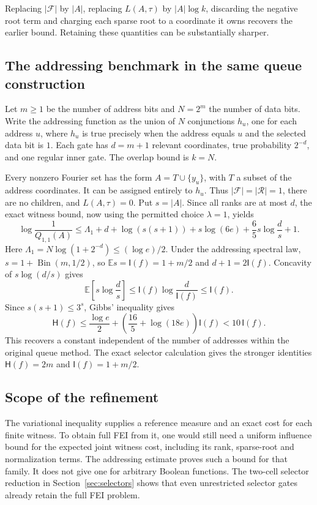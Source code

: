 \documentclass[11pt]{amsart}
\theoremstyle{definition}
\theoremstyle{remark}
\newcommand{\E}{\mathbb E}
\newcommand{\HH}{\mathsf H}
\newcommand{\I}{\mathsf I}
\begin{document}
Replacing $|\mathcal F|$ by $|A|$, replacing $L(A,\tau)$ by
$|A|\log k$, discarding the negative root term and charging each sparse
root to a coordinate it owns recovers the earlier bound. Retaining these
quantities can be substantially sharper.

\subsection{The addressing benchmark in the same queue construction}

Let $m\ge1$ be the number of address bits and $N=2^m$ the number of
data bits. Write the addressing function as the union of $N$ conjunctions
$h_u$, one for each address $u$, where $h_u$ is true precisely when the
address equals $u$ and the selected data bit is $1$.
Each gate has $d=m+1$ relevant coordinates, true probability $2^{-d}$,
and one regular inner gate. The overlap bound is $k=N$.

Every nonzero Fourier set has the form $A=T\cup\{y_u\}$, with $T$ a
subset of the address coordinates. It can be assigned entirely to
$h_u$. Thus $|\mathcal F|=|\mathcal R|=1$, there are no children,
and $L(A,\tau)=0$.
Put $s=|A|$. Since all ranks are at most $d$, the exact witness bound,
now using the permitted choice $\lambda=1$, yields
\[
 \log\frac1{Q_{1,1}(A)}
 \le\Lambda_1+d+\log(s(s+1))+s\log(6e)
       +\frac65s\log\frac ds+1.
\]
Here
$\Lambda_1=N\log(1+2^{-d})\le(\log e)/2$.
Under the addressing spectral law,
$s=1+\operatorname{Bin}(m,1/2)$, so
$\E s=\I(f)=1+m/2$ and $d+1=2\I(f)$.
Concavity of $s\log(d/s)$ gives
\[
 \mathbb E\left[s\log\frac ds\right]
 \le\I(f)\log\frac d{\I(f)}\le\I(f).
\]
Since $s(s+1)\le3^s$, Gibbs' inequality gives
\[
 \HH(f)\le\frac{\log e}{2}
       +\left(\frac{16}{5}+\log(18e)\right)\I(f)
       <10\,\I(f).
\]
This recovers a constant independent of the number of addresses within
the original queue method. The exact selector calculation gives the
stronger identities $\HH(f)=2m$ and $\I(f)=1+m/2$.

\subsection{Scope of the refinement}

The variational inequality supplies a reference measure and an exact
cost for each finite witness. To obtain full FEI from it, one would still
need a uniform influence bound for the expected joint witness cost,
including its rank, sparse-root and normalization terms.
The addressing estimate proves such a bound for that family.
It does not give one for arbitrary Boolean functions.
The two-cell selector reduction in Section~\ref{sec:selectors} shows that even unrestricted
selector gates already retain the full FEI problem.
\end{document}

